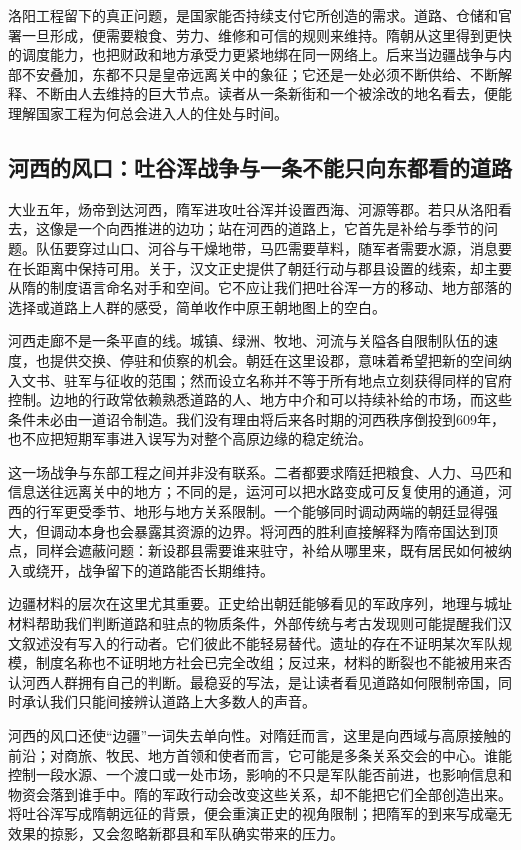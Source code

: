 洛阳工程留下的真正问题，是国家能否持续支付它所创造的需求。道路、仓储和官署一旦形成，便需要粮食、劳力、维修和可信的规则来维持。隋朝从这里得到更快的调度能力，也把财政和地方承受力更紧地绑在同一网络上。后来当边疆战争与内部不安叠加，东都不只是皇帝远离关中的象征；它还是一处必须不断供给、不断解释、不断由人去维持的巨大节点。读者从一条新街和一个被涂改的地名看去，便能理解国家工程为何总会进入人的住处与时间。

\subsection{河西的风口：吐谷浑战争与一条不能只向东都看的道路}
大业五年，炀帝到达河西，隋军进攻吐谷浑并设置西海、河源等郡。若只从洛阳看去，这像是一个向西推进的边功；站在河西的道路上，它首先是补给与季节的问题。队伍要穿过山口、河谷与干燥地带，马匹需要草料，随军者需要水源，消息要在长距离中保持可用。关于，汉文正史提供了朝廷行动与郡县设置的线索，却主要从隋的制度语言命名对手和空间。它不应让我们把吐谷浑一方的移动、地方部落的选择或道路上人群的感受，简单收作中原王朝地图上的空白。

河西走廊不是一条平直的线。城镇、绿洲、牧地、河流与关隘各自限制队伍的速度，也提供交换、停驻和侦察的机会。朝廷在这里设郡，意味着希望把新的空间纳入文书、驻军与征收的范围；然而设立名称并不等于所有地点立刻获得同样的官府控制。边地的行政常依赖熟悉道路的人、地方中介和可以持续补给的市场，而这些条件未必由一道诏令制造。我们没有理由将后来各时期的河西秩序倒投到609年，也不应把短期军事进入误写为对整个高原边缘的稳定统治。

这一场战争与东部工程之间并非没有联系。二者都要求隋廷把粮食、人力、马匹和信息送往远离关中的地方；不同的是，运河可以把水路变成可反复使用的通道，河西的行军更受季节、地形与地方关系限制。一个能够同时调动两端的朝廷显得强大，但调动本身也会暴露其资源的边界。将河西的胜利直接解释为隋帝国达到顶点，同样会遮蔽问题：新设郡县需要谁来驻守，补给从哪里来，既有居民如何被纳入或绕开，战争留下的道路能否长期维持。

边疆材料的层次在这里尤其重要。正史给出朝廷能够看见的军政序列，地理与城址材料帮助我们判断道路和驻点的物质条件，外部传统与考古发现则可能提醒我们汉文叙述没有写入的行动者。它们彼此不能轻易替代。遗址的存在不证明某次军队规模，制度名称也不证明地方社会已完全改组；反过来，材料的断裂也不能被用来否认河西人群拥有自己的判断。最稳妥的写法，是让读者看见道路如何限制帝国，同时承认我们只能间接辨认道路上大多数人的声音。

河西的风口还使“边疆”一词失去单向性。对隋廷而言，这里是向西域与高原接触的前沿；对商旅、牧民、地方首领和使者而言，它可能是多条关系交会的中心。谁能控制一段水源、一个渡口或一处市场，影响的不只是军队能否前进，也影响信息和物资会落到谁手中。隋的军政行动会改变这些关系，却不能把它们全部创造出来。将吐谷浑写成隋朝远征的背景，便会重演正史的视角限制；把隋军的到来写成毫无效果的掠影，又会忽略新郡县和军队确实带来的压力。

